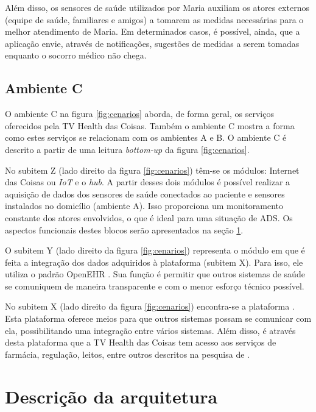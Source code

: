 Além disso, os sensores de saúde utilizados por Maria auxiliam os atores
externos (equipe de saúde, familiares e amigos) a tomarem as medidas
necessárias para o melhor atendimento de Maria.  Em determinados casos, é
possível, ainda, que a aplicação envie, através de notificações, sugestões de
medidas a serem tomadas enquanto o socorro médico não chega.

\subsection{Ambiente C} \label{subsec:ambiente-c}

O ambiente C na figura \ref{fig:cenarios} aborda, de forma geral, os serviços
oferecidos pela TV Health das Coisas.  Também o ambiente C mostra a forma como
estes serviços se relacionam com os ambientes A e B. O ambiente C é descrito a
partir de uma leitura \textit{bottom-up} da figura \ref{fig:cenarios}. 

No subitem Z (lado direito da figura \ref{fig:cenarios}) têm-se os módulos:
Internet das Coisas ou \textit{IoT} e o \textit{hub}. A partir desses dois
módulos é possível realizar a aquisição de dados dos sensores de saúde
conectados ao paciente e sensores instalados no domicílio (ambiente A).  Isso
proporciona um monitoramento constante dos atores envolvidos, o que é ideal
para uma situação de ADS. Os aspectos funcionais destes blocos serão
apresentados na seção \ref{sec:descricao-solucao}.

O subitem Y (lado direito da figura \ref{fig:cenarios}) representa o módulo em
que é feita a integração dos dados adquiridos à plataforma \nextsaude[]
(subitem X).  Para isso, ele utiliza o padrão OpenEHR \cite{mota2016}. Sua
função é permitir que outros sistemas de saúde se comuniquem de maneira
transparente e com o menor esforço técnico possível.

No subitem X (lado direito da figura \ref{fig:cenarios}) encontra-se a
plataforma \nextsaude[]. Esta plataforma oferece meios para que outros sistemas
possam se comunicar com ela, possibilitando uma integração entre vários
sistemas. Além disso, é através desta plataforma que a TV Health das Coisas tem
acesso aos serviços de farmácia, regulação, leitos, entre outros descritos na
pesquisa de .

\section{Descrição da arquitetura}
\label{sec:descricao-solucao}

